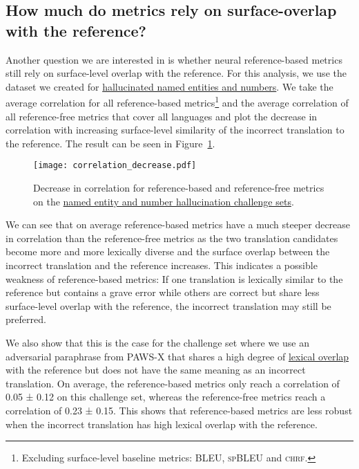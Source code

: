 \documentclass[11pt]{article}
\begin{document}
\subsection{How much do metrics rely on surface-overlap with the reference?}
\label{subsec:surface-relevance}
Another question we are interested in is whether neural reference-based metrics still rely on surface-level overlap with the reference. For this analysis, we use the dataset we created for \hyperref[subsec:levels]{hallucinated named entities and numbers}. We take the average correlation for all reference-based metrics\footnote{Excluding surface-level baseline metrics: \textsc{BLEU},  \textsc{spBLEU} and \textsc{chrf}.} and the average correlation of all reference-free metrics that cover all languages and plot the decrease in correlation with increasing surface-level similarity of the incorrect translation to the reference. The result can be seen in Figure~\ref{fig:corr_decrease}.


\begin{figure}
    \centering
    \texttt{[image: correlation\_decrease.pdf]}
    \caption{Decrease in correlation for reference-based and reference-free metrics on the \hyperref[subsec:levels]{named entity and number hallucination challenge sets}.}
    \label{fig:corr_decrease}
\end{figure}


We can see that on average reference-based metrics have a much steeper decrease in correlation than the reference-free metrics as the two translation candidates become more and more lexically diverse and the surface overlap between the incorrect translation and the reference increases. This indicates a possible weakness of reference-based metrics: If one translation is lexically similar to the reference but contains a grave error while others are correct but share less surface-level overlap with the reference, the incorrect translation may still be preferred.

We also show that this is the case for the challenge set where we use an adversarial paraphrase from PAWS-X that shares a high degree of \hyperref[subsec:lexical-overlap]{lexical overlap} with the reference but does not have the same meaning as an incorrect translation. On average, the reference-based metrics only reach a correlation of 0.05 ± 0.12 on this challenge set, whereas the reference-free metrics reach a correlation of 0.23 ± 0.15. This shows that reference-based metrics are less robust when the incorrect translation has high lexical overlap with the reference.
\end{document}
